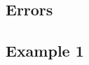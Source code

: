 \documentclass{article}
\begin{document}
\subsection{Errors}

\subsection{Example 1}

\end{document}
